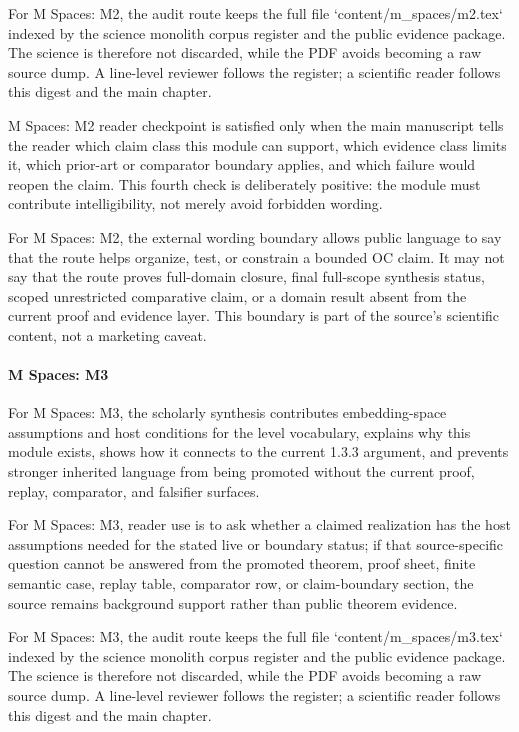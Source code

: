 For M Spaces: M2, the audit route keeps the full file `content/m\_spaces/m2.tex` indexed by the science monolith corpus register and the public evidence package. The science is therefore not discarded, while the PDF avoids becoming a raw source dump. A line-level reviewer follows the register; a scientific reader follows this digest and the main chapter.


M Spaces: M2 reader checkpoint is satisfied only when the main manuscript tells the reader which claim class this module can support, which evidence class limits it, which prior-art or comparator boundary applies, and which failure would reopen the claim. This fourth check is deliberately positive: the module must contribute intelligibility, not merely avoid forbidden wording.


For M Spaces: M2, the external wording boundary allows public language to say that the route helps organize, test, or constrain a bounded OC claim. It may not say that the route proves full-domain closure, final full-scope synthesis status, scoped unrestricted comparative claim, or a domain result absent from the current proof and evidence layer. This boundary is part of the source's scientific content, not a marketing caveat.


\paragraph{M Spaces: M3}

For M Spaces: M3, the scholarly synthesis contributes embedding-space assumptions and host conditions for the level vocabulary, explains why this module exists, shows how it connects to the current 1.3.3 argument, and prevents stronger inherited language from being promoted without the current proof, replay, comparator, and falsifier surfaces.


For M Spaces: M3, reader use is to ask whether a claimed realization has the host assumptions needed for the stated live or boundary status; if that source-specific question cannot be answered from the promoted theorem, proof sheet, finite semantic case, replay table, comparator row, or claim-boundary section, the source remains background support rather than public theorem evidence.


For M Spaces: M3, the audit route keeps the full file `content/m\_spaces/m3.tex` indexed by the science monolith corpus register and the public evidence package. The science is therefore not discarded, while the PDF avoids becoming a raw source dump. A line-level reviewer follows the register; a scientific reader follows this digest and the main chapter.


